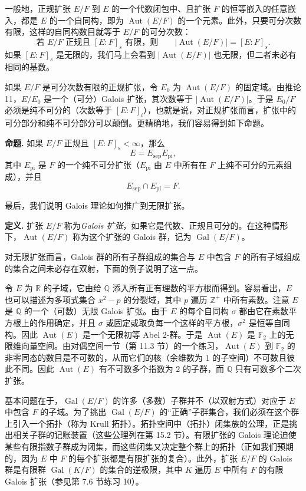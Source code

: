 一般地，正规扩张 $E/F$ 到 $E$ 的一个代数闭包中、且扩张 $F$ 的恒等嵌入的任意嵌入，都是 $E$ 的一个自同构，即为 $\operatorname{Aut}(E/F)$ 的一个元素。此外，只要可分次数有限，这样的自同构数目就等于 $E/F$ 的可分次数：
\[
\text{若 }E/F\text{ 正规且 }[E:F]_s\text{ 有限，则}\qquad
|\operatorname{Aut}(E/F)|=[E:F]_s.
\]
如果 $[E:F]_s$ 是无限的，我们马上会看到 $|\operatorname{Aut}(E/F)|$ 也无限，但二者未必有相同的基数。

如果 $E/F$ 是可分次数有限的正规扩张，令 $E_0$ 为 $\operatorname{Aut}(E/F)$ 的固定域。由推论 11，$E/E_0$ 是一个（可分）Galois 扩张，其次数等于 $|\operatorname{Aut}(E/F)|$。于是 $E_0/F$ 必须是纯不可分的（次数等于 $[E:F]_i$），也就是说，对正规扩张而言，扩张中的可分部分和纯不可分部分可以颠倒。更精确地，我们容易得到如下命题。

\noindent\textbf{命题.} 如果 $E/F$ 正规且 $[E:F]_s<\infty$，那么
\[
E=E_{\mathrm{sep}}E_{\mathrm{pi}},
\]
其中 $E_{\mathrm{pi}}$ 是 $F$ 的一个纯不可分扩张（$E_{\mathrm{pi}}$ 由 $E$ 中所有在 $F$ 上纯不可分的元素组成），并且
\[
E_{\mathrm{sep}}\cap E_{\mathrm{pi}}=F.
\]

最后，我们说明 Galois 理论如何推广到无限扩张。

\noindent\textbf{定义.} 扩张 $E/F$ 称为\emph{Galois 扩张}，如果它是代数、正规且可分的。在这种情形下，$\operatorname{Aut}(E/F)$ 称为这个扩张的 Galois 群，记为 $\operatorname{Gal}(E/F)$。

对无限扩张而言，Galois 群的所有子群组成的集合与 $E$ 中包含 $F$ 的所有子域组成的集合之间未必存在双射，下面的例子说明了这一点。

令 $E$ 为 $\mathbb R$ 的子域，它由给 $\mathbb Q$ 添入所有正有理数的平方根而得到。容易看出，$E$ 也可以描述为多项式集合 $x^2-p$ 的分裂域，其中 $p$ 遍历 $\mathbb Z^+$ 中所有素数。注意 $E$ 是 $\mathbb Q$ 的一个（可数）无限 Galois 扩张。由于 $E$ 的每个自同构 $\sigma$ 都由它在素数平方根上的作用确定，并且 $\sigma$ 或固定或取负每一个这样的平方根，$\sigma^2$ 是恒等自同构。因此 $\operatorname{Aut}(E)$ 是一个无限初等 Abel $2$-群。于是 $\operatorname{Aut}(E)$ 是 $\mathbb F_2$ 上的无限维向量空间。由对偶空间一节（第 11.3 节）的一个练习，$\operatorname{Aut}(E)$ 到 $\mathbb F_2$ 的非零同态的数目是不可数的，从而它们的核（余维数为 $1$ 的子空间）不可数且彼此不同。因此 $\operatorname{Aut}(E)$ 有不可数多个指数为 $2$ 的子群，而 $\mathbb Q$ 只有可数多个二次扩张。

基本问题在于，$\operatorname{Gal}(E/F)$ 的许多（多数）子群并不（以双射方式）对应于 $E$ 中包含 $F$ 的子域。为了挑出 $\operatorname{Gal}(E/F)$ 的“正确”子群集合，我们必须在这个群上引入一个拓扑（称为 Krull 拓扑）。拓扑空间中（拓扑）闭集族的公理，正是挑出相关子群的记账装置（这些公理列在第 15.2 节）。有限扩张的 Galois 理论迫使某些有限指数子群成为闭集，而这些闭集又决定整个群上的拓扑（正如我们预期的，因为 $E$ 中 $F$ 的每个扩张都是有限扩张的复合）。此外，扩张 $E/F$ 的 Galois 群是有限群 $\operatorname{Gal}(K/F)$ 的集合的逆极限，其中 $K$ 遍历 $E$ 中所有 $F$ 的有限 Galois 扩张（参见第 7.6 节练习 10）。

